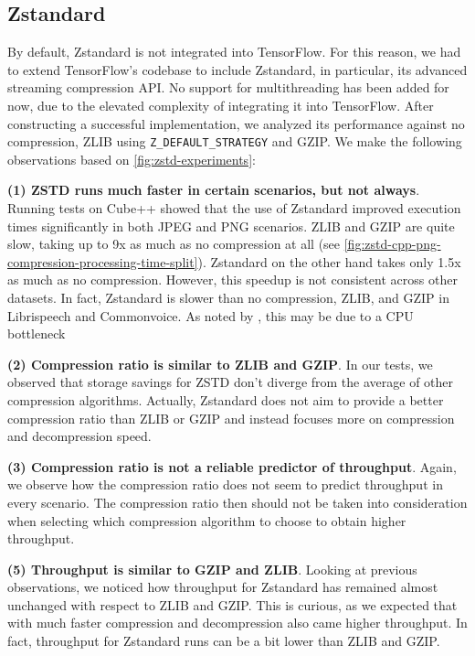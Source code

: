 \documentclass[sigconf,nonacm]{acmart}
\begin{document}
\subsection{Zstandard}
By default, Zstandard is not integrated into TensorFlow.
For this reason, we had to extend TensorFlow's codebase to include Zstandard, in particular, its advanced streaming compression API.
No support for multithreading has been added for now, due to the elevated complexity of integrating it into TensorFlow.
After constructing a successful implementation, we analyzed its performance against no compression, ZLIB using \texttt{Z\_DEFAULT\_STRATEGY} and GZIP.
We make the following observations based on \autoref{fig:zstd-experiments}:

\textbf{(1) ZSTD runs much faster in certain scenarios, but not always}.
Running tests on Cube++ showed that the use of Zstandard improved execution times significantly in both JPEG and PNG scenarios.
ZLIB and GZIP are quite slow, taking up to 9x as much as no compression at all (see \autoref{fig:zstd-cpp-png-compression-processing-time-split}).
Zstandard on the other hand takes only 1.5x as much as no compression.
However, this speedup is not consistent across other datasets.
In fact, Zstandard is slower than no compression, ZLIB, and GZIP in Librispeech and Commonvoice.
As noted by \cite{isenko2022bottleneck}, this may be due to a CPU bottleneck 

\textbf{(2) Compression ratio is similar to ZLIB and GZIP}.
In our tests, we observed that storage savings for ZSTD don't diverge from the average of other compression algorithms.
Actually, Zstandard does not aim to provide a better compression ratio than ZLIB or GZIP and instead focuses more on compression and decompression speed.

\textbf{(3) Compression ratio is not a reliable predictor of throughput}.
Again, we observe how the compression ratio does not seem to predict throughput in every scenario.
The compression ratio then should not be taken into consideration when selecting which compression algorithm to choose to obtain higher throughput.

\textbf{(5) Throughput is similar to GZIP and ZLIB}.
Looking at previous observations, we noticed how throughput for Zstandard has remained almost unchanged with respect to ZLIB and GZIP.
This is curious, as we expected that with much faster compression and decompression also came higher throughput.
In fact, throughput for Zstandard runs can be a bit lower than ZLIB and GZIP.
\end{document}
